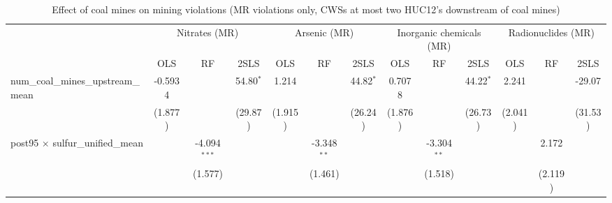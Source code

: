 
\begin{table}[htbp]
   
   \caption{\label{2sls_dwnstrm2step_minevio_mr} Effect of coal mines on mining violations (MR violations only, CWSs at most two HUC12's downstream of coal mines)}
   \bigskip
   
   \centering
   
   \begin{adjustbox}{width = \textwidth, center}
      
      
      \begin{tabular}{lcccccccccccc}
         \toprule
         
          & \multicolumn{3}{c}{Nitrates (MR)} & \multicolumn{3}{c}{Arsenic (MR)} & \multicolumn{3}{c}{Inorganic chemicals (MR)} & \multicolumn{3}{c}{Radionuclides (MR)}\\
         
                                                                             & OLS           & RF             & 2SLS          & OLS           & RF            & 2SLS          & OLS           & RF            & 2SLS          & OLS           & RF            & 2SLS\\  
         
         \midrule 
         num\_coal\_mines\_upstream\_mean                                    & -0.5934       &                & 54.80$^{*}$   & 1.214         &               & 44.82$^{*}$   & 0.7078        &               & 44.22$^{*}$   & 2.241         &               & -29.07\\   
                                                                             & (1.877)       &                & (29.87)       & (1.915)       &               & (26.24)       & (1.876)       &               & (26.73)       & (2.041)       &               & (31.53)\\   
         post95 $\times$ sulfur\_unified\_mean                               &               & -4.094$^{***}$ &               &               & -3.348$^{**}$ &               &               & -3.304$^{**}$ &               &               & 2.172         &   \\   
                                                                             &               & (1.577)        &               &               & (1.461)       &               &               & (1.518)       &               &               & (2.119)       &   \\   
         

\end{tabular}
\end{adjustbox}
\end{table}
